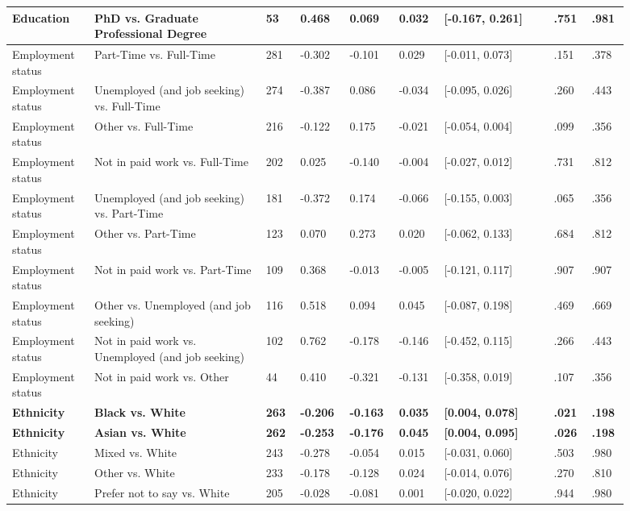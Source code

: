 {\begin{longtable}{L{0.12\linewidth}L{0.25\linewidth}R{0.05\linewidth}R{0.065\linewidth}R{0.065\linewidth}R{0.065\linewidth}R{0.16\linewidth}R{0.055\linewidth}R{0.055\linewidth}}
Education & PhD vs. Graduate Professional Degree & 53 & 0.468 & 0.069 & 0.032 & [-0.167, 0.261] & .751 & .981 \\
\midrule
Employment status & Part-Time vs. Full-Time & 281 & -0.302 & -0.101 & 0.029 & [-0.011, 0.073] & .151 & .378 \\
Employment status & Unemployed (and job seeking) vs. Full-Time & 274 & -0.387 & 0.086 & -0.034 & [-0.095, 0.026] & .260 & .443 \\
Employment status & Other vs. Full-Time & 216 & -0.122 & 0.175 & -0.021 & [-0.054, 0.004] & .099 & .356 \\
Employment status & Not in paid work vs. Full-Time & 202 & 0.025 & -0.140 & -0.004 & [-0.027, 0.012] & .731 & .812 \\
Employment status & Unemployed (and job seeking) vs. Part-Time & 181 & -0.372 & 0.174 & -0.066 & [-0.155, 0.003] & .065 & .356 \\
Employment status & Other vs. Part-Time & 123 & 0.070 & 0.273 & 0.020 & [-0.062, 0.133] & .684 & .812 \\
Employment status & Not in paid work vs. Part-Time & 109 & 0.368 & -0.013 & -0.005 & [-0.121, 0.117] & .907 & .907 \\
Employment status & Other vs. Unemployed (and job seeking) & 116 & 0.518 & 0.094 & 0.045 & [-0.087, 0.198] & .469 & .669 \\
Employment status & Not in paid work vs. Unemployed (and job seeking) & 102 & 0.762 & -0.178 & -0.146 & [-0.452, 0.115] & .266 & .443 \\
Employment status & Not in paid work vs. Other & 44 & 0.410 & -0.321 & -0.131 & [-0.358, 0.019] & .107 & .356 \\
\midrule
\textbf{Ethnicity} & \textbf{Black vs. White} & \textbf{263} & \textbf{-0.206} & \textbf{-0.163} & \textbf{0.035} & \textbf{[0.004, 0.078]} & \textbf{.021} & \textbf{.198} \\
\textbf{Ethnicity} & \textbf{Asian vs. White} & \textbf{262} & \textbf{-0.253} & \textbf{-0.176} & \textbf{0.045} & \textbf{[0.004, 0.095]} & \textbf{.026} & \textbf{.198} \\
Ethnicity & Mixed vs. White & 243 & -0.278 & -0.054 & 0.015 & [-0.031, 0.060] & .503 & .980 \\
Ethnicity & Other vs. White & 233 & -0.178 & -0.128 & 0.024 & [-0.014, 0.076] & .270 & .810 \\
Ethnicity & Prefer not to say vs. White & 205 & -0.028 & -0.081 & 0.001 & [-0.020, 0.022] & .944 & .980 \\

\end{longtable}}
